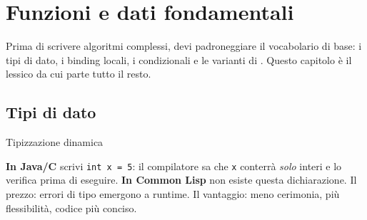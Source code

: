 ﻿%

\chapter{Funzioni e dati fondamentali}

\begin{intuizione}
Prima di scrivere algoritmi complessi, devi padroneggiare
il vocabolario di base: i tipi di dato, i binding locali,
i condizionali e le varianti di .
Questo capitolo è il lessico da cui parte tutto il resto.
\end{intuizione}

\vspace{4pt}

\section{Tipi di dato}

\begin{concetto}{Tipizzazione dinamica}


\boxsep


\boxsep


\end{concetto}

\begin{confronto}
\textbf{In Java/C} scrivi \texttt{int x = 5}: il compilatore sa che
\texttt{x} conterrà \emph{solo} interi e lo verifica prima di eseguire.
\textbf{In Common Lisp} non esiste questa dichiarazione.
Il prezzo: errori di tipo emergono a runtime.
Il vantaggio: meno cerimonia, più flessibilità, codice più conciso.
\end{confronto}

